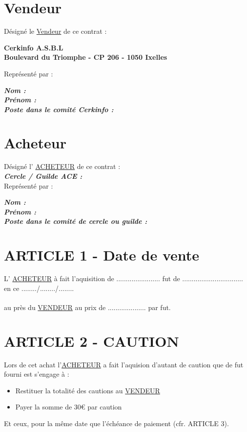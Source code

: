 \documentclass{article}
\begin{document}
\section*{Vendeur}
Désigné le \underline{Vendeur} de ce contrat :

\begin{center}
    \textbf{Cerkinfo A.S.B.L}\\
    \textbf{Boulevard du Triomphe - CP 206 - 1050 Ixelles}
\end{center}
Représenté par :

    \textbf{\textit{Nom :}}\\
    
    \textbf{\textit{Prénom :}}\\
    
    \textbf{\textit{Poste dans le comité Cerkinfo :}}

\section*{Acheteur}
Désigné l' \underline{ACHETEUR} de ce contrat : \\

    \textbf{\textit{Cercle / Guilde ACE :}}\\

Représenté par :

    \textbf{\textit{Nom :}}\\
    
    \textbf{\textit{Prénom :}}\\
    
    \textbf{\textit{Poste dans le comité de cercle ou guilde :}}
    
\newpage

\section*{ARTICLE 1 - Date de vente}
L' \underline{ACHETEUR} à fait l'aquisition de ....................... fut de ................................ en ce ......../......../........ 
\\\\au près du \underline{VENDEUR} au prix de .................... par fut.

\section*{ARTICLE 2 - CAUTION}
Lors de cet achat l'\underline{ACHETEUR} a fait l'aquision d'autant de caution que de fut fourni est s'engage à :
\begin{itemize}
    \item Restituer la totalité des cautions au \underline{VENDEUR}
    \item Payer la somme de 30€ par caution
\end{itemize}
Et ceux, pour la même date que l'échéance de paiement (cfr. ARTICLE 3).
\end{document}
